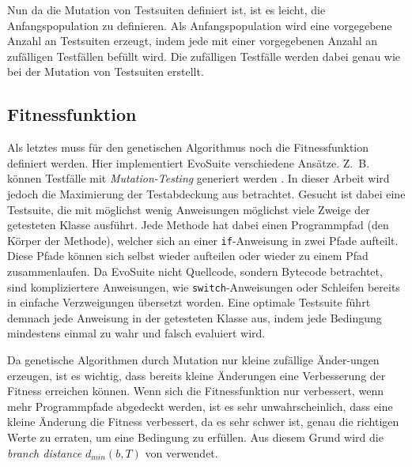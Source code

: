 \documentclass[a4paper,11pt]{article}
\begin{document}
Nun da die Mutation von Testsuiten definiert ist, ist es leicht, die Anfangspopulation zu definieren.
Als Anfangspopulation wird eine vorgegebene Anzahl an Testsuiten erzeugt, indem jede mit einer vorgegebenen Anzahl an zufälligen Testfällen befüllt wird.
Die zufälligen Testfälle werden dabei genau wie bei der Mutation von Testsuiten erstellt.

\subsection{Fitnessfunktion}

Als letztes muss für den genetischen Algorithmus noch die Fitnessfunktion definiert werden.
Hier implementiert EvoSuite verschiedene Ansätze.
Z.~B. können Testfälle mit \textit{Mutation-Testing} generiert werden \cite{emse14_mutation}.
In dieser Arbeit wird jedoch die Maximierung der Testabdeckung aus \cite{TSE12_EvoSuite} betrachtet.
Gesucht ist dabei eine Testsuite, die mit möglichst wenig Anweisungen möglichst viele Zweige der getesteten Klasse ausführt.
Jede Methode hat dabei einen Programmpfad (den Körper der Methode), welcher sich an einer \lstinline{if}-Anweisung in zwei Pfade aufteilt.
Diese Pfade können sich selbst wieder aufteilen oder wieder zu einem Pfad zusammenlaufen.
Da EvoSuite nicht Quellcode, sondern Bytecode betrachtet, sind kompliziertere Anweisungen, wie \lstinline{switch}-Anweisungen oder Schleifen bereits in einfache Verzweigungen übersetzt worden.
Eine optimale Testsuite führt demnach jede Anweisung in der getesteten Klasse aus, indem jede Bedingung mindestens einmal zu wahr und falsch evaluiert wird.

Da genetische Algorithmen durch Mutation nur kleine zufällige Änder-ungen erzeugen, ist es wichtig, dass bereits kleine Änderungen eine Verbesserung der Fitness erreichen können.
Wenn sich die Fitnessfunktion nur verbessert, wenn mehr Programmpfade abgedeckt werden, ist es sehr unwahrscheinlich, dass eine kleine Änderung die Fitness verbessert, da es sehr schwer ist, genau die richtigen Werte zu erraten, um eine Bedingung zu erfüllen.
Aus diesem Grund wird die \textit{branch distance} $d_{min}(b, T)$ von \citet{10.1109/32.57624} verwendet.
\end{document}
